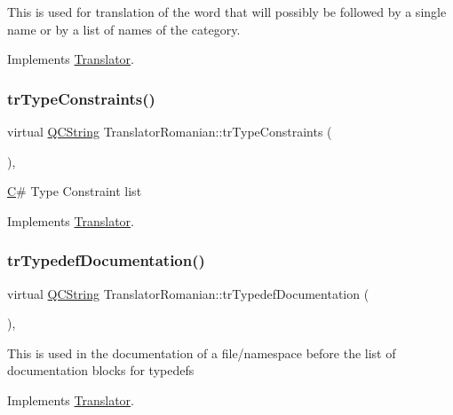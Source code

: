 This is used for translation of the word that will possibly be followed by a single name or by a list of names of the category. 

Implements \mbox{\hyperlink{class_translator}{Translator}}.

\mbox{\label{class_translator_romanian_aaf39b359b3d5817c23e4c2ff1c6470be}} 
\subsubsection{\texorpdfstring{trTypeConstraints()}{trTypeConstraints()}}
{\footnotesize\ttfamily virtual \mbox{\hyperlink{class_q_c_string}{Q\+C\+String}} Translator\+Romanian\+::tr\+Type\+Constraints (\begin{DoxyParamCaption}{ }\end{DoxyParamCaption})\hspace{0.3cm}{\ttfamily [inline]}, {\ttfamily [virtual]}}

\mbox{\hyperlink{class_c}{C}}\# Type Constraint list 

Implements \mbox{\hyperlink{class_translator}{Translator}}.

\mbox{\label{class_translator_romanian_afe7047addc8ecbfc7105ea27eee1a49e}} 
\subsubsection{\texorpdfstring{trTypedefDocumentation()}{trTypedefDocumentation()}}
{\footnotesize\ttfamily virtual \mbox{\hyperlink{class_q_c_string}{Q\+C\+String}} Translator\+Romanian\+::tr\+Typedef\+Documentation (\begin{DoxyParamCaption}{ }\end{DoxyParamCaption})\hspace{0.3cm}{\ttfamily [inline]}, {\ttfamily [virtual]}}

This is used in the documentation of a file/namespace before the list of documentation blocks for typedefs 

Implements \mbox{\hyperlink{class_translator}{Translator}}.


